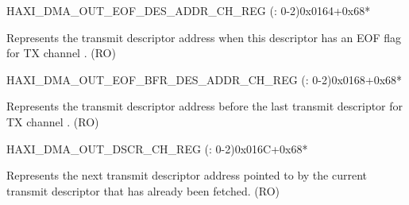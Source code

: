 \begin{register}{H}{AXI\_DMA\_OUT\_EOF\_DES\_ADDR\_CH\_REG (: 0-2)}{0x0164+0x68*}\label{regdesc:AXIDMAOUTEOFDESADDRCHNREG}
%
\regnewline%
\begin{regdesc}\begin{reglist}
\label{fielddesc:AXIDMAOUTEOFDESADDRCHN}\item [AXI\_DMA\_OUT\_EOF\_DES\_ADDR\_CH\regindex{n}] Represents the transmit descriptor address when this descriptor has an EOF flag for TX channel . (RO)
\end{reglist}\end{regdesc}
\end{register}


\begin{register}{H}{AXI\_DMA\_OUT\_EOF\_BFR\_DES\_ADDR\_CH\_REG (: 0-2)}{0x0168+0x68*}\label{regdesc:AXIDMAOUTEOFBFRDESADDRCHNREG}
%
\regnewline%
\begin{regdesc}\begin{reglist}
\label{fielddesc:AXIDMAOUTEOFBFRDESADDRCHN}\item [AXI\_DMA\_OUT\_EOF\_BFR\_DES\_ADDR\_CH\regindex{n}] Represents the transmit descriptor address before the last transmit descriptor for TX channel . (RO)
\end{reglist}\end{regdesc}
\end{register}


\begin{register}{H}{AXI\_DMA\_OUT\_DSCR\_CH\_REG (: 0-2)}{0x016C+0x68*}\label{regdesc:AXIDMAOUTDSCRCHNREG}
%
\regnewline%
\begin{regdesc}\begin{reglist}
\label{fielddesc:AXIDMAOUTLINKDSCRCHN}\item [AXI\_DMA\_OUTLINK\_DSCR\_CH\regindex{n}] Represents the next transmit descriptor address pointed to by the current transmit descriptor that has already been fetched. (RO)
\end{reglist}\end{regdesc}
\end{register}


